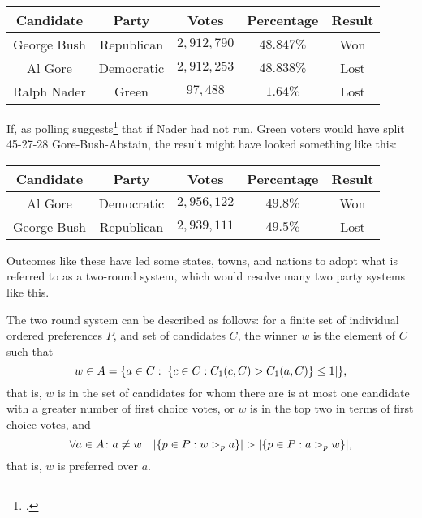 \documentclass{article}
\begin{document}
\begin{table}[H]\centering
\begin{tabular}{|c|c|c|c|c|}
\hline\rowcolor{headc}
Candidate & Party & Votes & Percentage & Result\\
\hline\rowcolor{advc}
George Bush & Republican & $2,912,790$ & $48.847\%$ & Won \\
\hline
Al Gore & Democratic & $2,912,253$ & $48.838\%$ & Lost \\
\hline 
Ralph Nader & Green & $97,488$ & $1.64\%$ & Lost \\
\hline
\end{tabular}
\label{2000fptp}
\end{table}

If, as polling suggests\footcite{Rosenbaum_2004} that if Nader had not run, Green voters would have split 45-27-28 Gore-Bush-Abstain, the result might have looked something like this:

\begin{table}[H]\centering
\begin{tabular}{|c|c|c|c|c|}
\hline\rowcolor{headc}
Candidate & Party & Votes & Percentage & Result\\
\hline\rowcolor{advc}
Al Gore & Democratic & $2,956,122$ & $49.8\%$ & Won \\
\hline
George Bush & Republican & $2,939,111$ & $49.5\%$ & Lost \\
\hline
\end{tabular}
\end{table}

Outcomes like these have led some states, towns, and nations to adopt what is referred to as a two-round system, which would resolve many two party systems like this.

The two round system can be described as follows: for a finite set of individual ordered preferences $P$, and set of candidates $C$, the winner $w$ is the element of $C$ such that
$$ w\in A = \qty{a\in C  :  \abs{\qty{c\in C: C_1(c, C) > C_1(a, C)} \leq 1}}, $$
that is, $w$ is in the set of candidates for whom there are is at most one candidate with a greater number of first choice votes, or $w$ is in the top two in terms of first choice votes, and
$$ \forall a \in A \colon a \neq w \quad \abs{\qty{p\in P : w >_p a}} > \abs{\qty{p\in P : a >_p w}}, $$
that is, $w$ is preferred over $a$.
\end{document}
